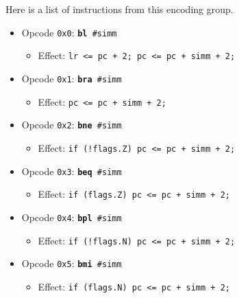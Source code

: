 \documentclass{article}
\begin{document}
	Here is a list of instructions from this encoding group.

	\singlespacing
	\begin{itemize}
		\item Opcode \texttt{0x0}:
			\texttt{\textbf{bl} \#simm}
		\begin{itemize}
			\item Effect:
				\texttt{lr <= pc + 2; pc <= pc + simm + 2;}
		\end{itemize}

		\item Opcode \texttt{0x1}:
			\texttt{\textbf{bra} \#simm}
		\begin{itemize}
			\item Effect:
				\texttt{pc <= pc + simm + 2;}
		\end{itemize}

		\item Opcode \texttt{0x2}:
			\texttt{\textbf{bne} \#simm}
		\begin{itemize}
			\item Effect:
				\texttt{if (!flags.Z) pc <= pc + simm + 2;}
		\end{itemize}

		\item Opcode \texttt{0x3}:
			\texttt{\textbf{beq} \#simm}
		\begin{itemize}
			\item Effect:
				\texttt{if (flags.Z) pc <= pc + simm + 2;}
		\end{itemize}

		\item Opcode \texttt{0x4}:
			\texttt{\textbf{bpl} \#simm}
		\begin{itemize}
			\item Effect:
				\texttt{if (!flags.N) pc <= pc + simm + 2;}
		\end{itemize}

		\item Opcode \texttt{0x5}:
			\texttt{\textbf{bmi} \#simm}
		\begin{itemize}
			\item Effect:
				\texttt{if (flags.N) pc <= pc + simm + 2;}
		\end{itemize}


\end{itemize}
\end{document}
